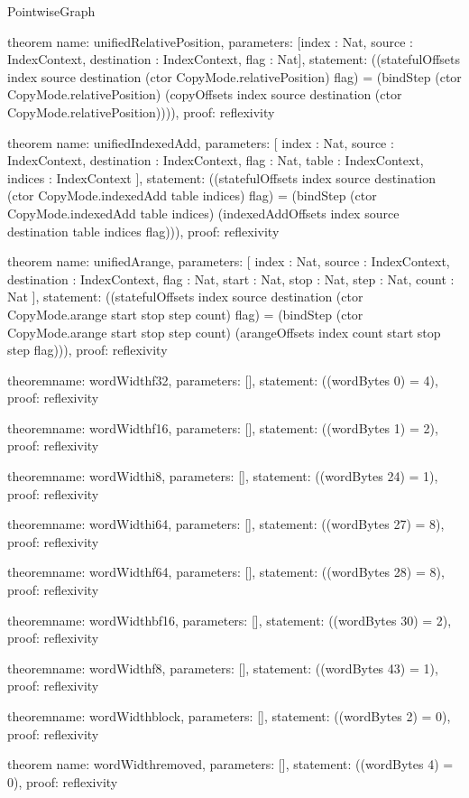 \begin{lexlean}{PointwiseGraph}
\begin{semanticmodule}
theorem{
  name: unifiedRelativePosition,
  parameters: [index : Nat, source : IndexContext, destination : IndexContext, flag : Nat],
  statement: ((statefulOffsets index source destination (ctor CopyMode.relativePosition) flag) = (bindStep (ctor CopyMode.relativePosition) (copyOffsets index source destination (ctor CopyMode.relativePosition)))),
  proof: reflexivity{}
}

theorem{
  name: unifiedIndexedAdd,
  parameters: [
    index : Nat,
    source : IndexContext,
    destination : IndexContext,
    flag : Nat,
    table : IndexContext,
    indices : IndexContext
  ],
  statement: ((statefulOffsets index source destination (ctor CopyMode.indexedAdd table indices) flag) = (bindStep (ctor CopyMode.indexedAdd table indices) (indexedAddOffsets index source destination table indices flag))),
  proof: reflexivity{}
}

theorem{
  name: unifiedArange,
  parameters: [
    index : Nat,
    source : IndexContext,
    destination : IndexContext,
    flag : Nat,
    start : Nat,
    stop : Nat,
    step : Nat,
    count : Nat
  ],
  statement: ((statefulOffsets index source destination (ctor CopyMode.arange start stop step count) flag) = (bindStep (ctor CopyMode.arange start stop step count) (arangeOffsets index count start stop step flag))),
  proof: reflexivity{}
}

theorem{name: wordWidthf32, parameters: [], statement: ((wordBytes 0) = 4), proof: reflexivity{}}

theorem{name: wordWidthf16, parameters: [], statement: ((wordBytes 1) = 2), proof: reflexivity{}}

theorem{name: wordWidthi8, parameters: [], statement: ((wordBytes 24) = 1), proof: reflexivity{}}

theorem{name: wordWidthi64, parameters: [], statement: ((wordBytes 27) = 8), proof: reflexivity{}}

theorem{name: wordWidthf64, parameters: [], statement: ((wordBytes 28) = 8), proof: reflexivity{}}

theorem{name: wordWidthbf16, parameters: [], statement: ((wordBytes 30) = 2), proof: reflexivity{}}

theorem{name: wordWidthf8, parameters: [], statement: ((wordBytes 43) = 1), proof: reflexivity{}}

theorem{name: wordWidthblock, parameters: [], statement: ((wordBytes 2) = 0), proof: reflexivity{}}

theorem{
  name: wordWidthremoved,
  parameters: [],
  statement: ((wordBytes 4) = 0),
  proof: reflexivity{}
}


\end{semanticmodule}
\end{lexlean}
